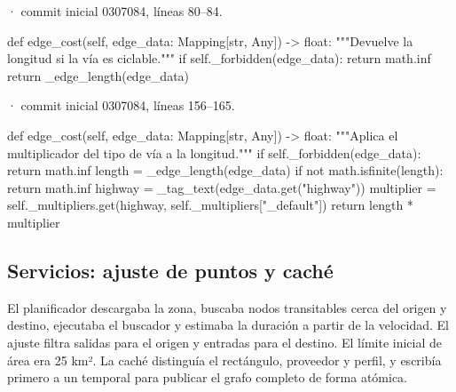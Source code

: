 \documentclass[11pt,a4paper]{article}
\begin{document}
\smallskip
{\footnotesize\texttt{} · commit inicial 0307084, líneas 80--84.}\par
\begin{Codigo}[firstnumber=80]
    def edge_cost(self, edge_data: Mapping[str, Any]) -> float:
        """Devuelve la longitud si la vía es ciclable."""
        if self._forbidden(edge_data):
            return math.inf
        return _edge_length(edge_data)
\end{Codigo}

\smallskip
{\footnotesize\texttt{} · commit inicial 0307084, líneas 156--165.}\par
\begin{Codigo}[firstnumber=156]
    def edge_cost(self, edge_data: Mapping[str, Any]) -> float:
        """Aplica el multiplicador del tipo de vía a la longitud."""
        if self._forbidden(edge_data):
            return math.inf
        length = _edge_length(edge_data)
        if not math.isfinite(length):
            return math.inf
        highway = _tag_text(edge_data.get("highway"))
        multiplier = self._multipliers.get(highway, self._multipliers["_default"])
        return length * multiplier
\end{Codigo}

\subsection{Servicios: ajuste de puntos y caché}
El planificador descargaba la zona, buscaba nodos transitables cerca del origen y destino, ejecutaba el buscador y estimaba la duración a partir de la velocidad. El ajuste filtra salidas para el origen y entradas para el destino. El límite inicial de área era 25 km². La caché distinguía el rectángulo, proveedor y perfil, y escribía primero a un temporal para publicar el grafo completo de forma atómica.
\end{document}

